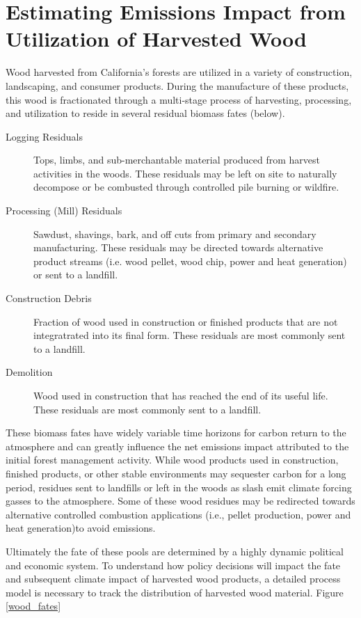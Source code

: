 \documentclass[a4paper]{article}
\begin{document}
\section{Estimating Emissions Impact from Utilization of Harvested Wood}
\label{sec:orgheadline20}
Wood harvested from California's forests are utilized in a variety of construction,
landscaping, and consumer products. During the manufacture of these products, this wood is fractionated 
through a multi-stage process of harvesting, processing, and utilization to reside in several residual biomass fates (below). 

\begin{description}
\item[{Logging Residuals}] Tops, limbs, and sub-merchantable material produced from harvest activities in the woods. These residuals may be left on site to naturally decompose or be combusted through controlled pile burning or wildfire.
\item[{Processing (Mill) Residuals}] Sawdust, shavings, bark, and off cuts from primary and secondary manufacturing. These residuals may be directed towards alternative product streams (i.e. wood pellet, wood chip, power and heat generation) or sent to a landfill.
\item[{Construction Debris}] Fraction of wood used in construction or finished products that are not integratrated into its final form. These residuals are most commonly sent to a landfill.
\item[{Demolition}] Wood used in construction that has reached the end of its useful life. These residuals are most commonly sent to a landfill.
\end{description}

These biomass fates have widely variable time horizons for carbon return to the atmosphere and can greatly influence the net emissions impact attributed to the initial forest management activity. While wood products used in construction, finished products, or other stable environments may sequester carbon for a long period, residues sent to landfills or left in the woods as slash emit climate forcing gasses to the atmosphere. Some of these wood residues may be redirected towards alternative controlled combustion applications (i.e., pellet production, power and heat generation)to avoid emissions.

Ultimately the fate of these pools are determined by a highly dynamic political and economic system. To understand how policy decisions will impact the fate and subsequent climate impact of harvested wood products, a detailed process model is necessary to track the distribution of harvested wood material. Figure \ref{wood_fates}
\end{document}
